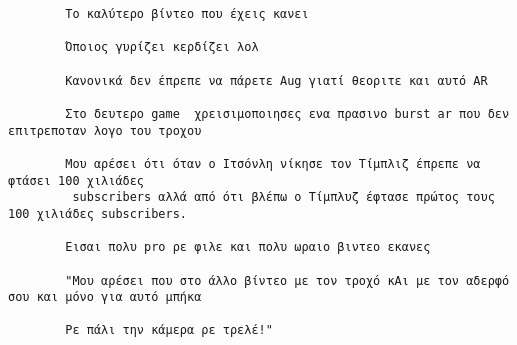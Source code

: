 \documentclass[11pt, a4paper]{article}
\begin{document}
\begin{verbatim}
		Το καλύτερο βίντεο που έχεις κανει
		
		Όποιος γυρίζει κερδίζει λολ
		
		Κανονικά δεν έπρεπε να πάρετε Aug γιατί θεοριτε και αυτό AR
		
		Στο δευτερο game  χρεισιμοποιησες ενα πρασινο burst ar που δεν επιτρεποταν λογο του τροχου
		
		Μου αρέσει ότι όταν ο Ιτσόνλη νίκησε τον Τίμπλιζ έπρεπε να φτάσει 100 χιλιάδες
		 subscribers αλλά από ότι βλέπω ο Τίμπλυζ έφτασε πρώτος τους 100 χιλιάδες subscribers.
		
		Εισαι πολυ pro ρε φιλε και πολυ ωραιο βιντεο εκανες
		
		"Μου αρέσει που στο άλλο βίντεο με τον τροχό κΑι με τον αδερφό σου και μόνο για αυτό μπήκα
		
		Ρε πάλι την κάμερα ρε τρελέ!"
	\end{verbatim}
	
\end{document}
